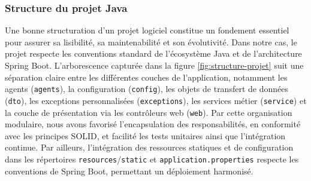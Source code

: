 \documentclass[12pt,a4paper]{report}
\begin{document}
	\subsubsection{Structure du projet Java}
	
	Une bonne structuration d’un projet logiciel constitue un fondement essentiel pour assurer sa lisibilité, sa maintenabilité et son évolutivité. Dans notre cas, le projet respecte les conventions standard de l’écosystème Java et de l’architecture Spring Boot. L’arborescence capturée dans la figure \ref{fig:structure-projet} suit une séparation claire entre les différentes couches de l’application, notamment les agents (\verb|agents|), la configuration (\verb|config|), les objets de transfert de données (\verb|dto|), les exceptions personnalisées (\verb|exceptions|), les services métier (\verb|service|) et la couche de présentation via les contrôleurs web (\verb|web|). Par cette organisation modulaire, nous avons favorisé l'encapsulation des responsabilités, en conformité avec les principes SOLID, et facilité les tests unitaires ainsi que l’intégration continue. Par ailleurs, l’intégration des ressources statiques et de configuration dans les répertoires \verb|resources|/\verb|static| et \verb|application.properties| respecte les conventions de Spring Boot, permettant un déploiement harmonisé.
	
\end{document}
